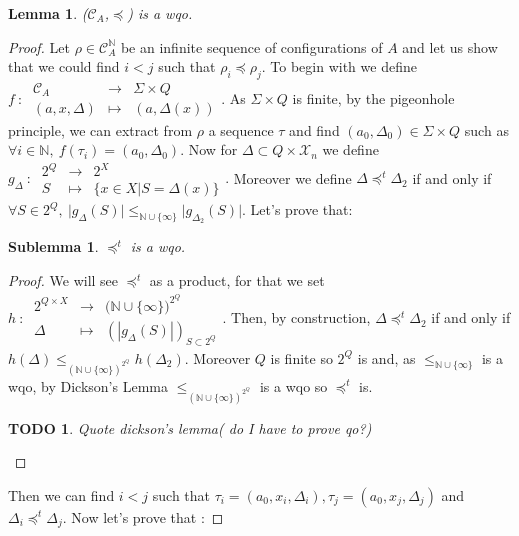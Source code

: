 \documentclass[a4paper,10pt]{report}
\newtheorem{lm}{Lemma}[thr]
\newtheorem{slm}{Sublemma}[lm]
\newtheorem{td}{TODO}
\newcommand{\dmap}[5]{
#1~:~\begin{array}{ccccc}
#2 &\to& #3 \\
#4  &\mapsto& #5
\end{array}}
\newcommand{\C}{\mathcal{C}_{A}}
\newcommand{\X}{\mathcal{X}_{n}}
\begin{document}
\begin{lm} \label{cd1}
  ($\C$,$\preceq$) is a wqo.
\end{lm}

\begin {proof}
Let $\rho \in \C^{\mathbb N}$ be an infinite sequence of configurations of $A$ and let us show that we could find $i < j$ such that $\rho_i \preceq \rho_j$.
To begin with we define
$\dmap{f}{\C}{\Sigma \times Q}{(a,x,\Delta)}{(a,\Delta(x))}$.
As $\Sigma \times Q$ is finite, by the pigeonhole principle, we can extract from $\rho$ a sequence $\tau$ and find $(a_0,\Delta_0) \in \Sigma \times Q$ such as 
$\forall i \in \mathbb N,\ f(\tau_i)=(a_0,\Delta_0)$.
Now for $\Delta \subset Q \times \X $ we define $\dmap{g_\Delta}{2^Q}{2^X}{S}{\{ x \in X | S=\Delta(x) \}} .$
Moreover we define $\Delta \preceq^t \Delta_2$ if and only if $\forall S \in 2^Q,\ \lvert g_\Delta(S) \lvert \leq_{\mathbb N \cup \{\infty\}} \lvert g_{\Delta_2}(S) \lvert$. Let's prove that: 
\begin{slm}
  $\preceq^t$ is a wqo.
\end{slm}
\begin{proof}
We will see $\preceq^t$ as a product, for that we set $ \dmap{h}{2^{Q\times X}}{({\mathbb N \cup \{\infty\})}^{2^Q}}{\Delta}{(|g_{\Delta}(S)|)_{S\subset {2^Q} }}.$
Then, by construction, $\Delta \preceq^t \Delta_2$ if and only if $ h(\Delta) \leq_{{(\mathbb N \cup \{\infty\})}^{2^Q}} h(\Delta_2)$.
Moreover $Q$ is finite so $2^Q$ is and, as $\leq_{\mathbb N \cup \{\infty\}}$ is a wqo, by Dickson's Lemma $\leq_{{(\mathbb N \cup \{\infty\})}^{2^Q}}$
is a wqo so $\preceq^t$ is.
\begin{td}
  Quote dickson's lemma( do I have to prove qo?) 
\end{td}
\end{proof}
Then we can find $i < j$ such that $\tau_i=(a_0,x_i,\Delta_i), \tau_j=(a_0,x_j,\Delta_j)$ and $\Delta_i \preceq^t \Delta_j$.
Now let's prove that :


\end{proof}
\end{document}
